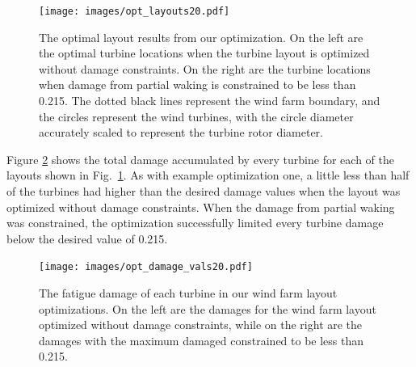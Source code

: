 \documentclass[11pt,letterpaper]{article}
\begin{document}
% 
\begin{figure}
    \centering
    \texttt{[image: images/opt\_layouts20.pdf]}
    \caption{The optimal layout results from our optimization. On the left are the optimal turbine locations when the turbine layout is optimized without damage constraints. On the right are the turbine locations when damage from partial waking is constrained to be less than 0.215. The dotted black lines represent the wind farm boundary, and the circles represent the wind turbines, with the circle diameter accurately scaled to represent the turbine rotor diameter.}
    \label{layouts_circ}
\end{figure}


Figure \ref{opt_damages_circ} shows the total damage accumulated by every turbine for each of the layouts shown in Fig.~\ref{layouts_circ}. As with example optimization one, a little less than half of the turbines had higher than the desired damage values when the layout was optimized without damage constraints. When the damage from partial waking was constrained, the optimization successfully limited every turbine damage below the desired value of 0.215.
% 
\begin{figure}
    \centering
    \texttt{[image: images/opt\_damage\_vals20.pdf]}
    \caption{The fatigue damage of each turbine in our wind farm layout optimizations. On the left are the damages for the wind farm layout optimized without damage constraints, while on the right are the damages with the maximum damaged constrained to be less than 0.215.}
    \label{opt_damages_circ}
\end{figure}
\end{document}
